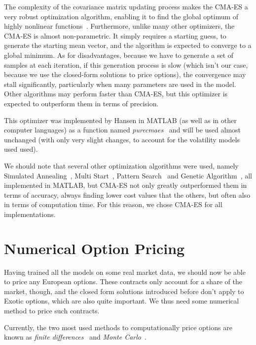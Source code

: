 The complexity of the covariance matrix updating process makes the CMA-ES a very robust optimization algorithm, enabling it to find the global optimum of highly nonlinear functions~\citep{DilaoCMA}.
Furthermore, unlike many other optimizers, the CMA-ES is almost non-parametric. It simply requires a starting guess, to generate the starting mean vector, and the algorithm is expected to converge to a global minimum.
As for disadvantages, because we have to generate a set of samples at each iteration, if this generation process is slow (which isn't our case, because we use the closed-form solutions to price options), the convergence may stall significantly, particularly when many parameters are used in the model. Other algorithms may perform faster than CMA-ES, but this optimizer is expected to outperform them in terms of precision.

This optimizer was implemented by Hansen in MATLAB (as well as in other computer languages) as a function named \emph{purecmaes}~\citep{CMAES} and will be used almost unchanged (with only very slight changes, to account for the volatility models used used).

We should note that several other optimization algorithms were used, namely Simulated Annealing~\citep{MATLABsa}, Multi Start~\citep{MATLABms}, Pattern Search~\citep{MATLABps} and Genetic Algorithm~\citep{MATLABga}, all implemented in MATLAB, but CMA-ES not only greatly outperformed them in terms of accuracy, always finding lower cost values that the others, but often also in terms of computation time. For this reason, we chose CMA-ES for all implementations.



\vfill
\newpage


\section{Numerical Option Pricing}
\label{section:Option Pricing}
Having trained all the models on some real market data, we should now be able to price any European options. These contracts only account for a share of the market, though, and the closed form solutions introduced before don't apply to Exotic options, which are also quite important. We thus need some numerical method to price such contracts.

Currently, the two most used methods to computationally price options are known as \emph{finite differences}~\citep{Hull} and \emph{Monte Carlo}~\citep{Glasserman}.

